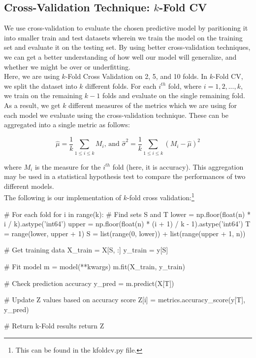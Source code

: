 \documentclass[fleqn]{article}
\begin{document}
    \subsection{Cross-Validation Technique: $k$-Fold CV}
    We use cross-validation to evaluate the chosen predictive model by paritioning it into
    smaller train and test datasets wherein we train the model on the training set and
    evaluate it on the testing set. By using better cross-validation techniques, we can
    get a better understanding of how well our model will generalize, and whether we might
    be over or underfitting.\\

    Here, we are using $k$-Fold Cross Validation on 2, 5, and 10 folds. In $k$-Fold CV, we
    split the dataset into $k$ different folds. For each $i^{th}$ fold, where
    $ i = 1, 2,...,k $, we train on the remaining $ k-1 $ folds and evaluate on the single
    remaining fold. As a result, we get $ k $ different measures of the metrics which we
    are using for each model we evaluate using the cross-validation technique. These can
    be aggregated into a single metric as follows:

    $$  \hat\mu = \frac{1}{k} \sum_{1\leq i \leq k} M_i \text{, and }
        \hat\sigma^2 = \frac{1}{k} \sum_{1\leq i \leq k} (M_i - \hat\mu)^2 $$

    \noindent
    where $ M_i $ is the measure for the $i^{th}$ fold (here, it is accuracy). This
    aggregation may be used in a statistical hypothesis test to compare the performances
    of two different models.\\

    \noindent
    The following is our implementation of $k$-fold cross validation:\footnote{This can be
    found in the kfoldcv.py file.}

    \begin{python}
    # For each fold
    for i in range(k):
        # Find sets S and T
        lower = np.floor(float(n) * i / k).astype('int64')
        upper = np.floor(float(n) * (i + 1) / k - 1).astype('int64')
        T = range(lower, upper + 1)
        S = list(range(0, lower)) + list(range(upper + 1, n))

        # Get training data
        X_train = X[S, :]
        y_train = y[S]

        # Fit model
        m = model(**kwargs)
        m.fit(X_train, y_train)

        # Check prediction accuracy
        y_pred = m.predict(X[T])

        # Update Z values based on accuracy score
        Z[i] = metrics.accuracy_score(y[T], y_pred)

    # Return k-Fold results
    return Z
    \end{python}
\end{document}
